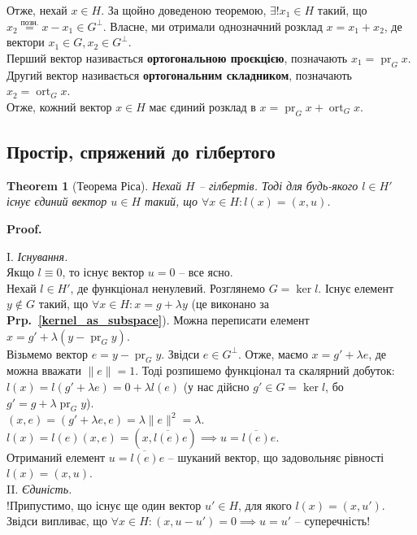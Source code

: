 \documentclass[a4paper, 10pt]{article}
\makeatletter
\theoremstyle{theoremdd}
\newtheorem{theorem}{Theorem}[subsection]
\theoremstyle{theoremdd}
\theoremstyle{theoremdd}
\theoremstyle{theoremdd}
\theoremstyle{theoremdd}
\theoremstyle{theoremdd}
\theoremstyle{theoremdd}
\theoremstyle{theoremdd}
\newcommand\prpref[1]{\textbf{Prp.~\ref{#1}}}
\DeclareMathOperator{\ort}{ort}
\DeclareMathOperator{\pr}{pr}
\renewenvironment{proof}[1][Proof.\\]{\par
\pushQED{\hfill \qed}%
\normalfont \topsep6\p@\@plus6\p@\relax
\trivlist
\item\relax
{\bfseries
#1\@addpunct{.}}\hspace\labelsep\ignorespaces
}{%
\popQED\endtrivlist\@endpefalse
}
\makeatother
\begin{document}
\noindent
Отже, нехай $x \in H$. За щойно доведеною теоремою, $\exists ! x_1 \in H$ такий, що $x_2 \overset{\text{позн.}}{=} x - x_1 \in G^\perp$. Власне, ми отримали однозначний розклад $x = x_1 + x_2$, де вектори $x_1 \in G, x_2 \in G^\perp$.\\
Перший вектор називається \textbf{ортогональною проєкцією}, позначають $x_1 = \pr_G x$.\\
Другий вектор називається \textbf{ортогональним складником}, позначають $x_2 = \ort_G x$.\\
Отже, кожний вектор $x \in H$ має єдиний розклад в $x = \pr_G x + \ort_G x$.

\subsection{Простір, спряжений до гілбертого}
\begin{theorem}[Теорема Ріса]
Нехай $H$ -- гілбертів. Тоді для будь-якого $l \in H'$ існує єдиний вектор $u \in H$ такий, що $\forall x \in H: l(x) = (x,u)$.
\end{theorem}

\begin{proof}
I. \textit{Існування.}\\
Якщо $l \equiv 0$, то існує вектор $u = 0$ -- все ясно.\\
Нехай $l \in H'$, де функціонал ненулевий. Розглянемо $G = \ker l$. Існує елемент $y \notin G$ такий, що $\forall x \in H: x = g + \lambda y$ (це виконано за \prpref{kernel_as_subspace}). Можна переписати елемент $x = g' + \lambda(y- \pr_G y)$.\\
Візьмемо вектор $e = y - \pr_Gy$. Звідси $e \in G^\perp$. Отже, маємо $x = g' + \lambda e$, де можна вважати $\|e\| = 1$. Тоді розпишемо функціонал та скалярний добуток:\\
$l(x) = l(g'+\lambda e) = 0 + \lambda l(e)$ (у нас дійсно $g' \in G = \ker l$, бо $g' = g + \lambda \pr_G y$).\\
$(x,e) = (g'+\lambda e,e) = \lambda \|e\|^2 = \lambda$.\\
$l(x) = l(e)(x,e) = (x,\overline{l(e)}e) \implies u = \overline{l(e)}e$.\\
Отриманий елемент $u = \overline{l(e)}e$ -- шуканий вектор, що задовольняє рівності $l(x) = (x,u)$.
\bigskip \\
II. \textit{Єдиність.}\\
!Припустимо, що існує ще один вектор $u' \in H$, для якого $l(x) = (x,u')$. Звідси випливає, що $\forall x \in H: (x,u-u') = 0 \implies u = u'$ -- суперечність!
\end{proof}
\end{document}
